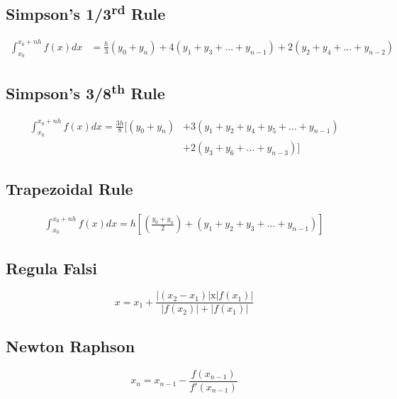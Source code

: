 \documentclass[a4paper, 12pt]{article}
\begin{document}
\vskip30pt
\begin{tcolorbox}

\section{Simpson's 1/3\textsuperscript{rd} Rule}
\begin{align*}
  \int_{x_0}^{x_0+nh}f(x)dx &= \frac{h}{3}(y_0+y_n)+4(y_1+y_3+\dots+y_{n-1})+2(y_2+y_4+\dots+y_{n-2})
\end{align*}
\end{tcolorbox}
\vskip30pt
\begin{tcolorbox}

\section{Simpson's 3/8\textsuperscript{th} Rule}
\begin{align*}
  \int_{x_0}^{x_0+nh}f(x)dx=\frac{3h}{8}[(y_0+y_n) &+ 3(y_1+y_2+y_4+y_5+\dots+y_{n-1})\\
                                                   &+ 2(y_3+y_6+\dots+y_{n-3})]
\end{align*}
\end{tcolorbox}
\vskip30pt
\begin{tcolorbox}

\section{Trapezoidal Rule}
\begin{align*}
  \int_{x_0}^{x_0+nh}f(x)dx = h[(\frac{y_0+y_n}{2})+(y_1+y_2+y_3+\dots+y_{n-1})]
\end{align*}
\end{tcolorbox}
\vskip30pt
\begin{tcolorbox}

\section{Regula Falsi}
\begin{equation*}
  x=x_1+\frac{|(x_2-x_1)|\text{x}|f(x_1)|}{|f(x_2)|+|f(x_1)|}
\end{equation*}
\end{tcolorbox}
\vskip30pt
\begin{tcolorbox}

\section{Newton Raphson}
\begin{equation*}
  x_n=x_{n-1}-\frac{f(x_{n-1})}{f'(x_{n-1})}
\end{equation*}
\end{tcolorbox}
\end{document}
